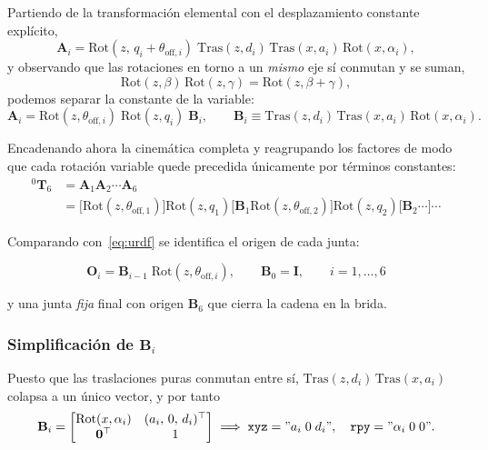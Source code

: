 \documentclass[11pt,a4paper]{article}
\newcommand{\T}[2]{{}^{#1}\mathbf{T}_{#2}}
\newcommand{\mat}[1]{\mathbf{#1}}
\begin{document}
Partiendo de la transformación elemental con el desplazamiento
constante explícito,
\begin{equation}
\mat{A}_i =
\mathrm{Rot}(z,\,q_i + \theta_{\mathrm{off},i})\;
\mathrm{Tras}(z,d_i)\,\mathrm{Tras}(x,a_i)\,\mathrm{Rot}(x,\alpha_i),
\end{equation}
y observando que las rotaciones en torno a un \emph{mismo} eje sí
conmutan y se suman,
\begin{equation}
\mathrm{Rot}(z,\beta)\,\mathrm{Rot}(z,\gamma) = \mathrm{Rot}(z,\beta+\gamma),
\label{eq:conmuta}
\end{equation}
podemos separar la constante de la variable:
\begin{equation}
\mat{A}_i =
\mathrm{Rot}(z,\theta_{\mathrm{off},i})\;
\mathrm{Rot}(z,q_i)\;
\mat{B}_i,
\qquad
\mat{B}_i \equiv
\mathrm{Tras}(z,d_i)\,\mathrm{Tras}(x,a_i)\,\mathrm{Rot}(x,\alpha_i).
\label{eq:factorizacion}
\end{equation}

Encadenando ahora la cinemática completa y reagrupando los factores de
modo que cada rotación variable quede precedida únicamente por términos
constantes:
\begin{align}
\T{0}{6} &= \mat{A}_1\mat{A}_2\cdots\mat{A}_6 \nonumber\\
&= \big[\mathrm{Rot}(z,\theta_{\mathrm{off},1})\big]\mathrm{Rot}(z,q_1)
   \big[\mat{B}_1\mathrm{Rot}(z,\theta_{\mathrm{off},2})\big]\mathrm{Rot}(z,q_2)
   \big[\mat{B}_2\cdots\big]\cdots
\end{align}

Comparando con~\eqref{eq:urdf} se identifica el origen de cada junta:

\begin{equation}
\boxed{\;
\mat{O}_i = \mat{B}_{i-1}\;\mathrm{Rot}(z,\theta_{\mathrm{off},i}),
\qquad \mat{B}_0 = \mat{I},
\qquad i = 1,\dots,6
\;}
\label{eq:puente}
\end{equation}

y una junta \emph{fija} final con origen $\mat{B}_6$ que cierra la
cadena en la brida.

\subsubsection*{Simplificación de \texorpdfstring{$\mat{B}_i$}{Bi}}

Puesto que las traslaciones puras conmutan entre sí,
$\mathrm{Tras}(z,d_i)\,\mathrm{Tras}(x,a_i)$ colapsa a un único vector,
y por tanto
\begin{equation}
\mat{B}_i =
\begin{bmatrix}
\mathrm{Rot}(x,\alpha_i) & (a_i,\,0,\,d_i)^{\top}\\
\mat{0}^{\top} & 1
\end{bmatrix}
\;\Longrightarrow\;
\texttt{xyz}="a_i\;0\;d_i",\quad
\texttt{rpy}="\alpha_i\;0\;0".
\end{equation}
\end{document}
